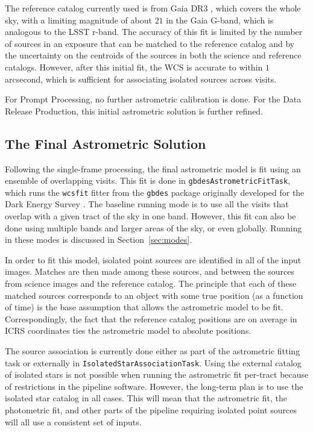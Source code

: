 \documentclass[DM,authoryear,toc]{lsstdoc}
\begin{document}
The reference catalog currently used is from Gaia DR3 \citep{2023A&A...674A...1G,DMTN-277}, which covers the whole sky, with a limiting magnitude of about $21$ in the Gaia G-band, which is analogous to the LSST r-band. The accuracy of this fit is limited by the number of sources in an exposure that can be matched to the reference catalog and by the uncertainty on the centroids of the sources in both the science and reference catalogs. However, after this initial fit, the WCS is accurate to within $1$ arcsecond, which is sufficient for associating isolated sources across visits.

For Prompt Processing, no further astrometric calibration is done. For the Data Release Production, this initial astrometric solution is further refined.

\subsection{The Final Astrometric Solution}\label{sec:final}
Following the single-frame processing, the final astrometric model is fit using an ensemble of overlapping visits. This fit is done in \texttt{gbdesAstrometricFitTask}, which runs the \texttt{wcsfit} fitter from the \texttt{gbdes} package originally developed for the Dark Energy Survey \citep{2017PASP..129g4503B}. The baseline running mode is to use all the visits that overlap with a given tract of the sky in one band. However, this fit can also be done using multiple bands and larger areas of the sky, or even globally. Running in these modes is discussed in Section~\ref{sec:modes}.

In order to fit this model, isolated point sources are identified in all of the input images. Matches are then made among these sources, and between the sources from science images and the reference catalog. The principle that each of these matched sources corresponds to an object with some true position (as a function of time) is the base assumption that allows the astrometric model to be fit. Correspondingly, the fact that the reference catalog positions are on average in ICRS coordinates ties the astrometric model to absolute positions.

The source association is currently done either as part of the astrometric fitting task or externally in \texttt{IsolatedStarAssociationTask}. Using the external catalog of isolated stars is not possible when running the astrometric fit per-tract because of restrictions in the pipeline software. However, the long-term plan is to use the isolated star catalog in all cases. This will mean that the astrometric fit, the photometric fit, and other parts of the pipeline requiring isolated point sources will all use a consistent set of inputs.
\end{document}
